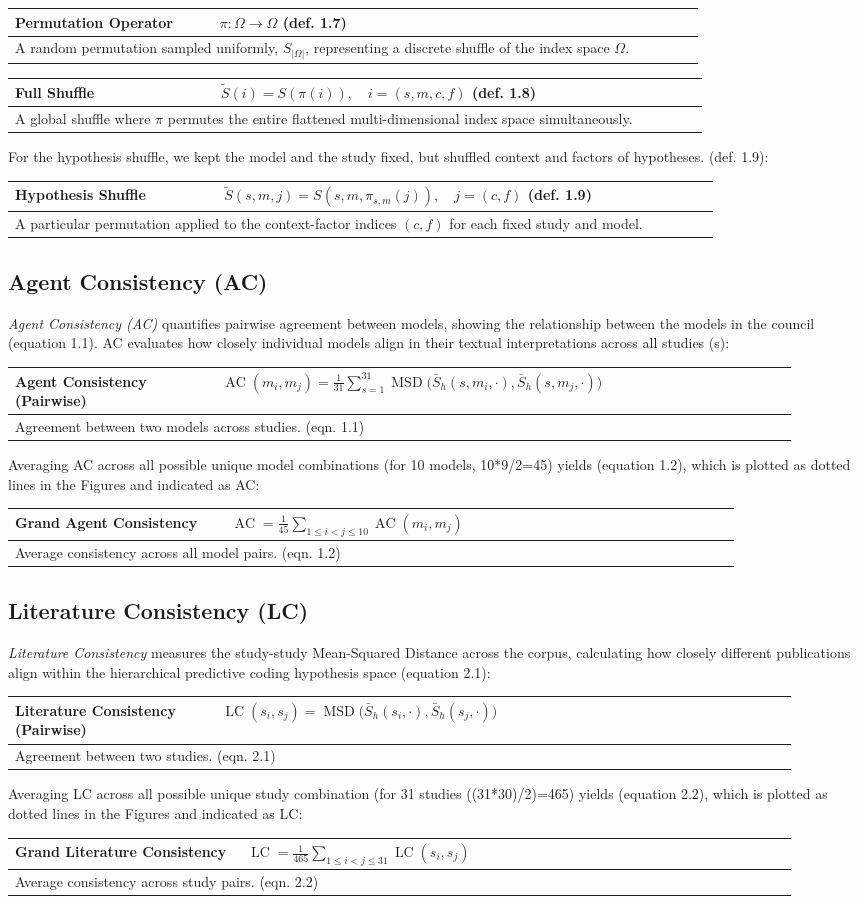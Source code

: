 \documentclass[12pt]{article}
\renewcommand{\arraystretch}{1.06}
\newcommand{\EquationBox}[3]{%
  \begin{center}
  \begingroup
  \small
  \setlength{\tabcolsep}{6pt}%
  \renewcommand{\arraystretch}{1.18}%
  \begin{tabular}{|p{0.27\linewidth}|p{0.64\linewidth}|}
  \hline
  \textbf{#1} & #2 \\
  \hline
  \multicolumn{2}{|p{0.94\linewidth}|}{#3} \\
  \hline
  \end{tabular}
  \endgroup
  \end{center}
}
\newcommand{\EquationBoxWideLeft}[3]{%
  \begin{center}
  \begingroup
  \small
  \setlength{\tabcolsep}{6pt}%
  \renewcommand{\arraystretch}{1.18}%
  \begin{tabular}{|p{0.24\linewidth}|p{0.67\linewidth}|}
  \hline
  \textbf{#1} & #2 \\
  \hline
  \multicolumn{2}{|p{0.94\linewidth}|}{#3} \\
  \hline
  \end{tabular}
  \endgroup
  \end{center}
}
\begin{document}
\EquationBox{Permutation Operator}{\(\pi:\Omega\to\Omega\) (def. 1.7)}{A random permutation sampled uniformly, \(S_{|\Omega|}\), representing a discrete shuffle of the index space \(\Omega\).}
\EquationBox{Full Shuffle}{\(\tilde{S}(i)=S(\pi(i)),\quad i=(s,m,c,f)\) (def. 1.8)}{A global shuffle where \(\pi\) permutes the entire flattened multi-dimensional index space simultaneously.}
For the hypothesis shuffle, we kept the model and the study fixed, but shuffled context and factors of hypotheses. (def. 1.9):
\EquationBox{Hypothesis Shuffle}{\(\tilde{S}(s,m,j)=S(s,m,\pi_{s,m}(j)),\quad j=(c,f)\) (def. 1.9)}{A particular permutation applied to the context-factor indices \((c,f)\) for each fixed study and model.}
\subsection{Agent Consistency (AC)}\label{agent-consistency-ac}

\emph{Agent Consistency (AC)} quantifies pairwise agreement between models, showing the relationship between the models in the council (equation 1.1). AC evaluates how closely individual models align in their textual interpretations across all studies (s):
\EquationBoxWideLeft{Agent Consistency (Pairwise)}{\(\displaystyle \operatorname{AC}(m_i,m_j)=\frac{1}{31}\sum_{s=1}^{31}\operatorname{MSD}\bigl(\bar{S}_h(s,m_i,\cdot),\bar{S}_h(s,m_j,\cdot)\bigr)\)}{Agreement between two models across studies. (eqn. 1.1)}
Averaging AC across all possible unique model combinations (for 10 models, 10*9/2=45) yields (equation 1.2), which is plotted as dotted lines in the Figures and indicated as AC:
\EquationBox{Grand Agent Consistency}{\(\displaystyle \operatorname{AC}=\frac{1}{45}\sum_{1\le i<j\le 10}\operatorname{AC}(m_i,m_j)\)}{Average consistency across all model pairs. (eqn. 1.2)}
\subsection{Literature Consistency (LC)}\label{literature-consistency-lc}

\emph{Literature Consistency} measures the study-study Mean-Squared Distance across the corpus, calculating how closely different publications align within the hierarchical predictive coding hypothesis space (equation 2.1):
\EquationBoxWideLeft{Literature Consistency (Pairwise)}{\(\displaystyle \operatorname{LC}(s_i,s_j)=\operatorname{MSD}\bigl(\bar{S}_h(s_i,\cdot),\bar{S}_h(s_j,\cdot)\bigr)\)}{Agreement between two studies. (eqn. 2.1)}
Averaging LC across all possible unique study combination (for 31 studies ((31*30)/2)=465) yields (equation 2.2), which is plotted as dotted lines in the Figures and indicated as LC:
\EquationBox{Grand Literature Consistency}{\(\displaystyle \operatorname{LC}=\frac{1}{465}\sum_{1\le i<j\le 31}\operatorname{LC}(s_i,s_j)\)}{Average consistency across study pairs. (eqn. 2.2)}
\end{document}
